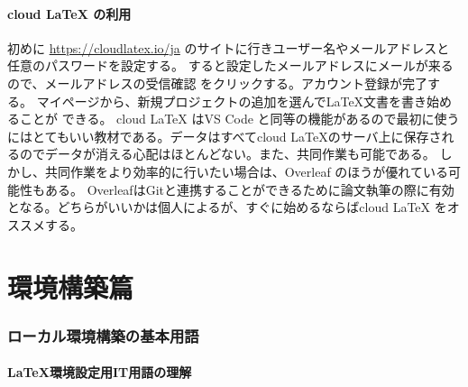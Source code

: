 \documentclass{ltjsarticle}
\begin{document}
\subsection{cloud LaTeX の利用}
初めに
\url{https://cloudlatex.io/ja}
のサイトに行きユーザー名やメールアドレスと任意のパスワードを設定する。
すると設定したメールアドレスにメールが来るので、メールアドレスの受信確認
をクリックする。アカウント登録が完了する。
マイページから、新規プロジェクトの追加を選んで\LaTeX 文書を書き始めることが
できる。
cloud LaTeX はVS Code と同等の機能があるので最初に使うにはとてもいい教材である。データはすべてcloud LaTeXのサーバ上に保存されるのでデータが消える心配はほとんどない。また、共同作業も可能である。
しかし、共同作業をより効率的に行いたい場合は、Overleaf のほうが優れている可能性もある。
OverleafはGitと連携することができるために論文執筆の際に有効となる。どちらがいいかは個人によるが、すぐに始めるならばcloud LaTeX をオススメする。

\part{環境構築篇}
\section{ローカル環境構築の基本用語}
\subsection{\LaTeX 環境設定用IT用語の理解}
\end{document}
